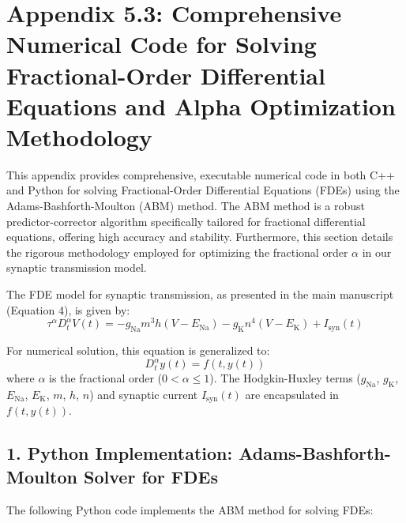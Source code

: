 \documentclass[a4paper,12pt]{article}
\begin{document}
\appendix
\section*{Appendix 5.3: Comprehensive Numerical Code for Solving Fractional-Order Differential Equations and Alpha Optimization Methodology}

This appendix provides comprehensive, executable numerical code in both C++ and Python for solving Fractional-Order Differential Equations (FDEs) using the Adams-Bashforth-Moulton (ABM) method. The ABM method is a robust predictor-corrector algorithm specifically tailored for fractional differential equations, offering high accuracy and stability. Furthermore, this section details the rigorous methodology employed for optimizing the fractional order $\alpha$ in our synaptic transmission model.

The FDE model for synaptic transmission, as presented in the main manuscript (Equation 4), is given by:
\begin{equation}
\tau^{\alpha} D^{\alpha}_t V(t) = -g_{\text{Na}} m^3 h(V - E_{\text{Na}}) - g_{\text{K}} n^4 (V - E_{\text{K}}) + I_{\text{syn}}(t)
\tag{A5.3.1}
\end{equation}

For numerical solution, this equation is generalized to:
\begin{equation}
D^{\alpha}_t y(t) = f(t, y(t))
\tag{A5.3.2}
\end{equation}
where $\alpha$ is the fractional order ($0 < \alpha \leq 1$). The Hodgkin-Huxley terms ($g_{\text{Na}}$, $g_{\text{K}}$, $E_{\text{Na}}$, $E_{\text{K}}$, $m$, $h$, $n$) and synaptic current $I_{\text{syn}}(t)$ are encapsulated in $f(t, y(t))$.

\subsection*{1. Python Implementation: Adams-Bashforth-Moulton Solver for FDEs}

The following Python code implements the ABM method for solving FDEs:
\end{document}
